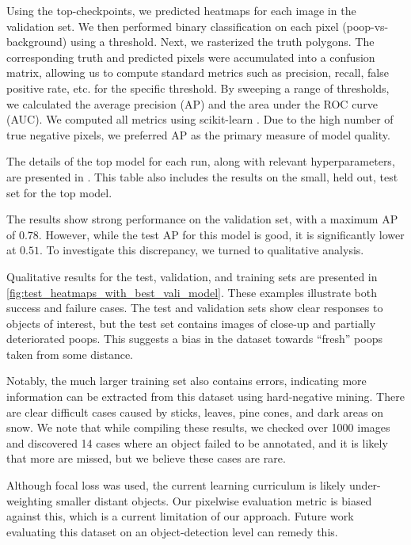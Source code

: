Using the top-checkpoints, we predicted heatmaps for each image in the validation set.
We then performed binary classification on each pixel (poop-vs-background) using a threshold.
Next, we rasterized the truth polygons.
The corresponding truth and predicted pixels were accumulated into a confusion matrix, allowing us to
  compute standard metrics such as precision, recall, false positive rate, etc.
\cite{powers_evaluation_2011} for the specific threshold.
By sweeping a range of thresholds, we calculated the average precision (AP) and the area under the ROC curve
  (AUC).
We computed all metrics using scikit-learn \cite{scikit-learn}.
Due to the high number of true negative pixels, we preferred AP as the primary measure of model quality.
  
The details of the top model for each run, along with relevant hyperparameters, are presented in
  .
This table also includes the results on the small, held out, test set for the top model.

The results show strong performance on the validation set, with a maximum AP of $0.78$.
However, while the test AP for this model is good, it is significantly lower at $0.51$.
To investigate this discrepancy, we turned to qualitative analysis.

Qualitative results for the test, validation, and training sets are presented in
  \cref{fig:test_heatmaps_with_best_vali_model}.
These examples illustrate both success and failure cases.
The test and validation sets show clear responses to objects of interest, but the test set contains images
  of close-up and partially deteriorated poops.
This suggests a bias in the dataset towards ``fresh'' poops taken from some distance.

Notably, the much larger training set also contains errors, indicating more information can be extracted
  from this dataset using hard-negative mining.
There are clear difficult cases caused by sticks, leaves, pine cones, and dark areas on snow.
We note that while compiling these results, we checked over 1000 images and discovered 14 cases where an
  object failed to be annotated, and it is likely that more are missed, but we believe these cases are rare.

Although focal loss was used, the current learning curriculum is likely under-weighting smaller distant
  objects.
Our pixelwise evaluation metric is biased against this, which is a current limitation of our approach.
Future work evaluating this dataset on an object-detection level can remedy this.

